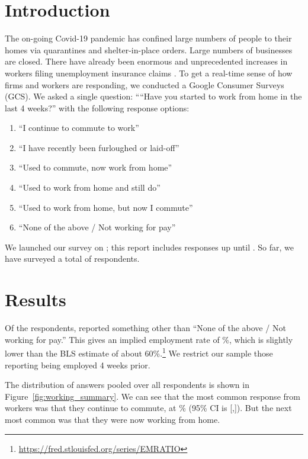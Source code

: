 \documentclass[12pt]{article}
\newcommand{\covid}{Covid-19}
\begin{document}
\section{Introduction}
The on-going \covid{} pandemic has confined large numbers of people to their homes via quarantines and shelter-in-place orders.
Large numbers of businesses are closed. 
There have already been enormous and unprecedented increases in workers filing unemployment insurance claims \citep{goldsmith2020}. 
To get a real-time sense of how firms and workers are responding, we conducted a Google Consumer Surveys (GCS). 
We asked a single question:
````Have you started to work from home in the last 4 weeks?''
with the following response options: 
\begin{enumerate} 
\item ``I continue to commute to work''
\item ``I have recently been furloughed or laid-off''
\item ``Used to commute, now work from home''   
\item ``Used to work from home and still do''       
\item ``Used to work from home, but now I commute''
\item ``None of the above / Not working for pay''
\end{enumerate} 

We launched our survey on \SurveyStart{}; this report includes responses up until \SurveyEnd{}. 
So far, we have surveyed a total of \numObs{} respondents.

\section{Results}

Of the respondents, \numObsWorking{} reported something other than ``None of the above / Not working for pay.''
This gives an implied employment rate of \LFPRhat{}\%, which is slightly lower than the BLS estimate of about 60\%.\footnote{
  \url{https://fred.stlouisfed.org/series/EMRATIO}
}
We restrict our sample those reporting being employed 4 weeks prior.

The distribution of answers pooled over all respondents is shown in Figure~\ref{fig:working_summary}. 
We can see that the most common response from workers was that they continue to commute, at \stillCommute{}\% (95\% CI is [\stillCommuteLB,\stillCommuteUB]). 
But the next most common was that they were now working from home. 
\end{document}
